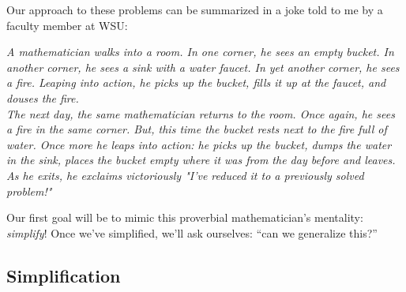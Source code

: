\documentclass[openany]{book}
\theoremstyle{definition}
\begin{document}
Our approach to these problems can be summarized in a joke told to me by a faculty member at WSU:

\begin{center}
    \emph{A mathematician walks into a room. In one corner, he sees an empty bucket. In another corner, he sees a sink with a water faucet. In yet another corner, he sees a fire. Leaping into action, he picks up the bucket, fills it up at the faucet, and douses the fire.}\\
    
    \emph{The next day, the same mathematician returns to the room. Once again, he sees a fire in the same corner. But, this time the bucket rests next to the fire full of water. Once more he leaps into action: he picks up the bucket, dumps the water in the sink, places the bucket empty where it was from the day before and leaves. As he exits, he exclaims victoriously "I’ve reduced it to a previously solved problem!"}
\end{center}
Our first goal will be to mimic this proverbial mathematician's mentality: \emph{simplify}! Once we've simplified, we'll ask ourselves: ``can we generalize this?''\\

\subsection{Simplification}
\end{document}
